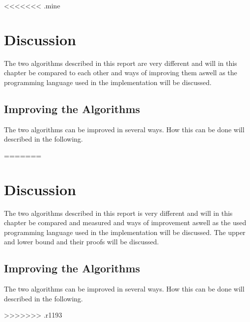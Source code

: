 <<<<<<< .mine
\chapter{Discussion}
\emptyTop{}
The two algorithms described in this report are very different and will in this chapter be compared to each other and ways of improving them aswell as the programming language used in the implementation will be discussed. 




\section{Improving the Algorithms}
The two algorithms can be improved in several ways. How this can be done will described in the following. 



=======
\chapter{Discussion}
\emptyTop{}
The two algorithms described in this report is very different and will in this chapter be compared and measured and ways of improvement aswell as the used programming language used in the implementation will be discussed. 
The upper and lower bound and their proofs will be discussed. 




\section{Improving the Algorithms}
The two algorithms can be improved in several ways. How this can be done will described in the following. 



>>>>>>> .r1193
